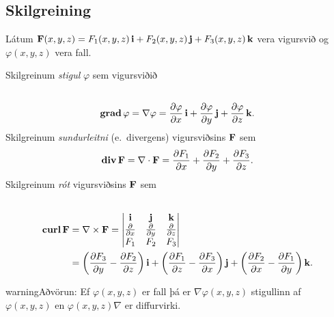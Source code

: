 \documentclass[a4paper,10pt,icelandic]{sphinxmanual}
\begin{document}
\subsection{Skilgreining}
\label{Kafli6:id1}
Látum
\(\mbox{${\bf F}$}(x,y,z)=F_1(x,y,z)\,\mbox{${\bf i}$}+F_2(x,y,z)\,\mbox{${\bf j}$}+F_3(x,y,z)\,\mbox{${\bf k}$}\)
vera vigursvið og \(\varphi(x,y,z)\) vera fall.

Skilgreinum \emph{stigul} \(\varphi\) sem vigursviðið
\begin{gather}
\begin{split}\displaystyle\end{split}\notag\\\begin{split}\mbox{${\rm\bf grad\,}$}\varphi=\nabla\varphi=\frac{\partial \varphi}{\partial x}\,\mbox{${\bf i}$}+
\frac{\partial \varphi}{\partial y}\,\mbox{${\bf j}$}+\frac{\partial \varphi}{\partial z}\,\mbox{${\bf k}$}.\end{split}\notag
\end{gather}
Skilgreinum \emph{sundurleitni} (e. divergens) vigursviðsins
\(\mbox{${\bf F}$}\) sem
\begin{gather}
\begin{split}\displaystyle \mbox{${\rm\bf div\,}$}\mbox{${\bf F}$}=\nabla\cdot\mbox{${\bf F}$}=\frac{\partial F_1}{\partial x}+\frac{\partial F_2}{\partial y}+\frac{\partial F_3}{\partial z}.\end{split}\notag
\end{gather}
Skilgreinum \emph{rót} vigursviðsins \(\mbox{${\bf F}$}\) sem
\begin{gather}
\begin{split}\displaystyle\end{split}\notag\\\begin{split}\begin{aligned}
 \mbox{${\rm\bf curl\,}$}\mbox{${\bf F}$}&=\nabla\times\mbox{${\bf F}$}=\begin{vmatrix} \mbox{${\bf i}$}&\mbox{${\bf j}$}&\mbox{${\bf k}$}\\
 \frac{\partial} {\partial x}&\frac{\partial}{\partial y}&\frac{\partial}{\partial z}\\F_1&F_2&F_3\end{vmatrix} \\ &=\bigg(\frac{\partial F_3}{\partial y}-\frac{\partial F_2}{\partial z}\bigg)\,\mbox{${\bf i}$}+\bigg(\frac{\partial F_1}{\partial z}-\frac{\partial F_3}{\partial x}\bigg)\,\mbox{${\bf j}$}+\bigg(\frac{\partial F_2}{\partial x}-\frac{\partial F_1}{\partial y}\bigg)\,\mbox{${\bf k}$}.
 \end{aligned}\end{split}\notag
\end{gather}
\begin{notice}{warning}{Aðvörun:}
Ef \(\varphi(x,y,z)\) er fall þá er \(\nabla \varphi(x,y,z)\) stigullinn af \(\varphi(x,y,z)\) en \(\varphi(x,y,z)\nabla\) er diffurvirki.
\end{notice}
\end{document}
